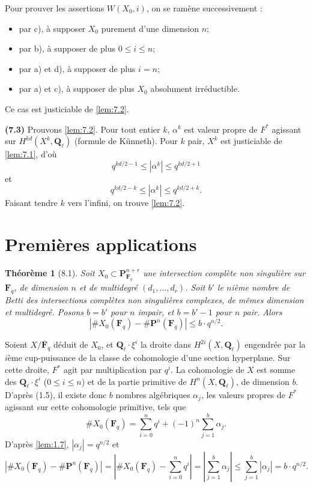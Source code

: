\documentclass[12pt,a4paper]{amsart}
\theoremstyle{plain}
\newtheorem{theoreme}{Th\'eor\`eme}[section]
\theoremstyle{definition}
\theoremstyle{remark}
\newcommand{\Q}{\mathbf{Q}}
\newcommand{\F}{\mathbf{F}}
\numberwithin{equation}{section}
\begin{document}
Pour prouver les assertions $W(X_0,i)$, on se ram\`ene successivement :
\begin{itemize}
\item par c), \`a supposer $X_0$ purement d'une dimension $n$;
\item par b), \`a supposer de plus $0\le i\le n$;
\item par a) et d), \`a supposer de plus $i=n$;
\item par a) et c), \`a supposer de plus $X_0$ absolument irr\'eductible.
\end{itemize}
Ce cas est justiciable de \eqref{lem:7.2}.

\noindent \textbf{(7.3)} Prouvons \eqref{lem:7.2}. Pour tout entier $k$, $\alpha^k$ est valeur propre de $F^*$ agissant sur $H^{kd}(X^k,\Q_\ell)$ (formule de K\"unneth). Pour $k$ pair, $X^k$ est justiciable de \eqref{lem:7.1}, d'o\`u
\[
q^{kd/2-1} \le |\alpha^k| \le q^{kd/2+1}
\]
et
\[
q^{kd/2-k} \le |\alpha^k| \le q^{kd/2+k}.
\]
Faisant tendre $k$ vers l'infini, on trouve \eqref{lem:7.2}.


\section{Premi\`eres applications}

\begin{theoreme}[8.1]\label{thm:8.1}
Soit $X_0\subset\mathbf{P}^{n+r}_{\F_q}$ une intersection compl\`ete non singuli\`ere sur $\F_q$, de dimension $n$ et de multidegr\'e $(d_1,\ldots,d_r)$. Soit $b'$ le $n$i\`eme nombre de Betti des intersections compl\`etes non singuli\`eres complexes, de m\^emes dimension et multidegr\'e. Posons $b=b'$ pour $n$ impair, et $b=b'-1$ pour $n$ pair. Alors
\[
|\#X_0(\F_q) - \#\mathbf{P}^n(\F_q)| \le b \cdot q^{n/2}.
\]
\end{theoreme}

Soient $X/\overline{\F}_q$ d\'eduit de $X_0$, et $\Q_\ell\cdot\xi^i$ la droite dans $H^{2i}(X,\Q_\ell)$ engendr\'ee par la $i$\`eme cup-puissance de la classe de cohomologie d'une section hyperplane. Sur cette droite, $F^*$ agit par multiplication par $q^i$. La cohomologie de $X$ est somme des $\Q_\ell\cdot\xi^i$ ($0\le i\le n$) et de la partie primitive de $H^n(X,\Q_\ell)$, de dimension $b$. D'apr\`es (1.5), il existe donc $b$ nombres alg\'ebriques $\alpha_j$, les valeurs propres de $F^*$ agissant sur cette cohomologie primitive, tels que
\[
\#X_0(\F_q) = \sum_{i=0}^n q^i + (-1)^n \sum_{j=1}^b \alpha_j.
\]
D'apr\`es \eqref{lem:1.7}, $|\alpha_j|=q^{n/2}$ et
\[
|\#X_0(\F_q) - \#\mathbf{P}^n(\F_q)| = |\#X_0(\F_q) - \sum_{i=0}^n q^i| = |\sum_{j=1}^b \alpha_j| \le \sum_{j=1}^b |\alpha_j| = b \cdot q^{n/2}.
\]
\end{document}
